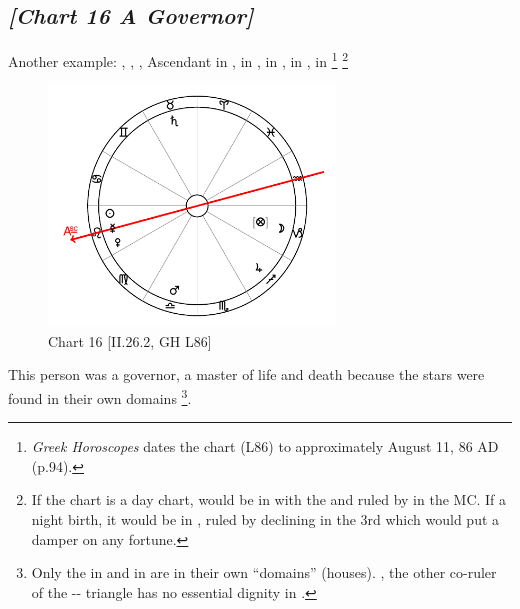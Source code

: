 \newpage
\subsection*{\textit{[Chart 16 A Governor]}}

Another example: \Sun, \Mercury, \Venus, Ascendant in \Leo, \Saturn\xspace in \Taurus, \Jupiter\xspace in \Sagittarius, \Mars\xspace in \Libra, \Moon\xspace in \Capricorn
\footnote{\textit{Greek Horoscopes} dates the chart (L86) to approximately August 11, 86 AD (p.94).}
\footnote{If the chart is a day chart, \Fortune\xspace would be in \Capricorn\xspace with the \Moon\xspace and ruled by \Saturn\xspace in the MC. If a night birth, it would be in \Scorpio\xspace, ruled by \Mars\xspace declining in the 3rd which would put a damper on any fortune.}

\clearpage
\begin{figure}
\centering
\vspace{-20pt}
\includegraphics[width=0.68\textwidth]{charts/2_26_2}
\caption{Chart 16 [II.26.2, GH L86]}
\vspace{-150pt}
\label{fig:chart16}
\end{figure}

This person was a governor, a master of life and death because the stars were found in their own domains
\footnote{Only the \Sun\xspace in \Leo\xspace and \Jupiter\xspace in \Sagittarius\xspace are in their own ``domains'' (houses). \Saturn, the other co-ruler of the \Aries-\Leo-\Sagittarius\xspace triangle has no essential dignity in \Taurus.}.

\newpage

